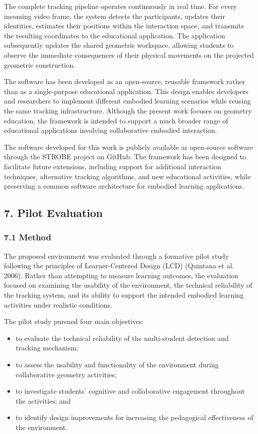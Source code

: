 The complete tracking pipeline operates continuously in real time. For
every incoming video frame, the system detects the participants, updates
their identities, estimates their positions within the interaction
space, and transmits the resulting coordinates to the educational
application. The application subsequently updates the shared geometric
workspace, allowing students to observe the immediate consequences of
their physical movements on the projected geometric construction.

The software has been developed as an open-source, reusable framework
rather than as a single-purpose educational application. This design
enables developers and researchers to implement different embodied
learning scenarios while reusing the same tracking infrastructure.
Although the present work focuses on geometry education, the framework
is intended to support a much broader range of educational applications
involving collaborative embodied interaction.

The software developed for this work is publicly available as
open-source software through the STROBE project on GitHub. The framework
has been designed to facilitate future extensions, including support for
additional interaction techniques, alternative tracking algorithms, and
new educational activities, while preserving a common software
architecture for embodied learning applications.

\subsection{7. Pilot Evaluation}\label{pilot-evaluation}

\subsubsection{7.1 Method}\label{method}

The proposed environment was evaluated through a formative pilot study
following the principles of Learner-Centered Design (LCD) (Quintana et
al. 2006). Rather than attempting to measure learning outcomes, the
evaluation focused on examining the usability of the environment, the
technical reliability of the tracking system, and its ability to support
the intended embodied learning activities under realistic conditions.

The pilot study pursued four main objectives:

\begin{itemize}
\tightlist
\item
  to evaluate the technical reliability of the multi-student detection
  and tracking mechanism;
\item
  to assess the usability and functionality of the environment during
  collaborative geometry activities;
\item
  to investigate students' cognitive and collaborative engagement
  throughout the activities; and
\item
  to identify design improvements for increasing the pedagogical
  effectiveness of the environment.
\end{itemize}

